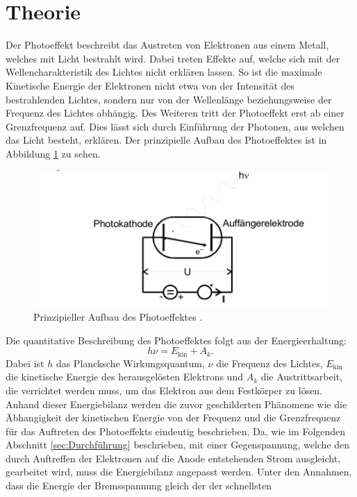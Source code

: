 \section{Theorie}
\label{sec:Theorie}
Der Photoeffekt beschreibt das Austreten von Elektronen aus einem Metall, welches mit Licht bestrahlt wird. Dabei treten Effekte auf, welche sich mit der Wellencharakteristik des Lichtes nicht erklären lassen.
So ist die maximale Kinetische Energie der Elektronen nicht etwa von der Intensität des bestrahlenden Lichtes, sondern nur von der Wellenlänge beziehungsweise der Frequenz des Lichtes abhängig. Des Weiteren
tritt der Photoeffekt erst ab einer Grenzfrequenz auf. Dies lässt sich durch
Einführung der Photonen, aus welchen das Licht besteht, erklären. Der prinzipielle Aufbau des Photoeffektes ist in Abbildung \ref{fig:Prinzip} zu sehen.
\begin{figure}
  \centering
  \includegraphics{images/Prinzip.png}
  \caption{Prinzipieller Aufbau des Photoeffektes \cite[73]{sample}.}
  \label{fig:Prinzip}
\end{figure}
Die quantitative Beschreibung des Photoeffektes folgt aus der Energieerhaltung:
\begin{equation}
  h \nu = E_\text{kin} + A_k .
  \label{eqn:energie1}
\end{equation}
Dabei ist $h$ das Plancksche Wirkungsquantum, $\nu$ die Frequenz des Lichtes, $E_\text{kin}$ die kinetische Energie des herausgelösten Elektrons und $A_k$ die Austrittsarbeit, die verrichtet werden muss, um das Elektron aus dem
Festkörper zu lösen. Anhand dieser Energiebilanz werden die zuvor geschilderten Phänomene wie die Äbhangigkeit der kinetischen Energie von der Frequenz und die Grenzfrequenz für das Auftreten des Photoeffekts eindeutig beschrieben.
Da, wie im Folgenden Abschnitt \ref{sec:Durchführung} beschrieben, mit einer Gegenspannung, welche den durch Auftreffen der Elektronen auf die Anode entstehenden Strom ausgleicht, gearbeitet wird, muss die Energiebilanz angepasst werden.
Unter den Annahmen, dass die Energie der Bremsspannung gleich der der schnellsten
